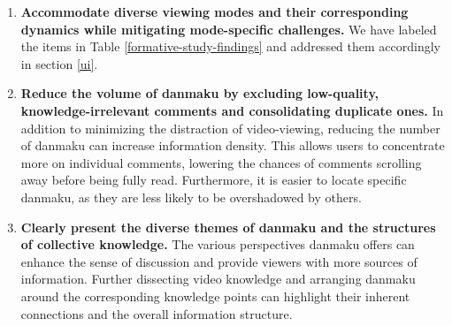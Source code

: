 \begin{enumerate}[label=\textbf{DR\arabic*}, leftmargin=3em]
    \item \textbf{Accommodate diverse viewing modes and their corresponding dynamics while mitigating mode-specific challenges.} We have labeled the items in Table \ref{formative-study-findings} and addressed them accordingly in section \ref{ui}.
    
    \item \textbf{Reduce the volume of danmaku by excluding low-quality, knowledge-irrelevant comments and consolidating duplicate ones.} 
    In addition to minimizing the distraction of video-viewing, reducing the number of danmaku can increase information density. This allows users to concentrate more on individual comments, lowering the chances of comments scrolling away before being fully read. Furthermore, it is easier to locate specific danmaku, as they are less likely to be overshadowed by others.
    
    \item \textbf{Clearly present the diverse themes of danmaku and the structures of collective knowledge.} The various perspectives danmaku offers can enhance the sense of discussion and provide viewers with more sources of information. Further dissecting video knowledge and arranging danmaku around the corresponding knowledge points can highlight their inherent connections and the overall information structure.
\end{enumerate}


